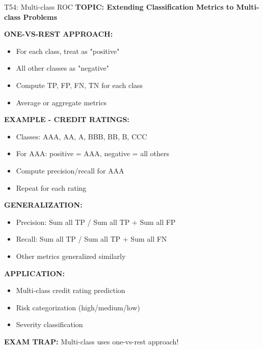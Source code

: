 \documentclass[8pt]{beamer}
\begin{document}
	\begin{frame}{T54: Multi-class ROC}
		\fontsize{6.5}{7.5}\selectfont
		\textbf{TOPIC: Extending Classification Metrics to Multi-class Problems}
		
		\vspace{0.1cm}
		\textbf{ONE-VS-REST APPROACH:}
		\begin{itemize}
			\item For each class, treat as "positive"
			\item All other classes as "negative"
			\item Compute TP, FP, FN, TN for each class
			\item Average or aggregate metrics
		\end{itemize}
		
		\vspace{0.1cm}
		\textbf{EXAMPLE - CREDIT RATINGS:}
		\begin{itemize}
			\item Classes: AAA, AA, A, BBB, BB, B, CCC
			\item For AAA: positive = AAA, negative = all others
			\item Compute precision/recall for AAA
			\item Repeat for each rating
		\end{itemize}
		
		\vspace{0.1cm}
		\textbf{GENERALIZATION:}
		\begin{itemize}
			\item Precision: Sum all TP / Sum all TP + Sum all FP
			\item Recall: Sum all TP / Sum all TP + Sum all FN
			\item Other metrics generalized similarly
		\end{itemize}
		
		\vspace{0.1cm}
		\textbf{APPLICATION:}
		\begin{itemize}
			\item Multi-class credit rating prediction
			\item Risk categorization (high/medium/low)
			\item Severity classification
		\end{itemize}
		
		\textcolor{myred}{\textbf{EXAM TRAP:}} Multi-class uses \textcolor{myblue}{one-vs-rest} approach!
	\end{frame}
	
\end{document}
